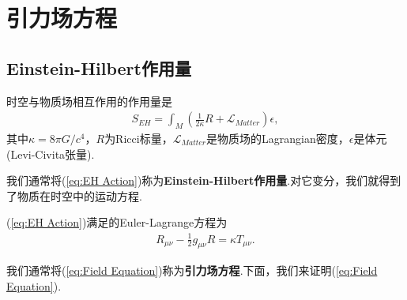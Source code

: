 \section{引力场方程}\label{sec:field equation}

\subsection{Einstein-Hilbert作用量}
\begin{definition}
    时空与物质场相互作用的作用量是
    \begin{eqnarray}\label{eq:EH Action}
        S_{EH}=\int_M\left(\frac{1}{2\kappa}R+\mathcal{L} _{Matter}\right)\epsilon,
    \end{eqnarray}
    其中$\kappa=8\pi G/c^4$，$R$为Ricci标量，$\mathcal{L} _{Matter}$是物质场的Lagrangian密度，$\epsilon$是体元(Levi-Civita张量).
\end{definition}
我们通常将(\ref{eq:EH Action})称为\textbf{Einstein-Hilbert作用量}.对它变分，我们就得到了物质在时空中的运动方程.
\begin{theorem}
    (\ref{eq:EH Action})满足的Euler-Lagrange方程为
    \begin{eqnarray}\label{eq:Field Equation}
        R_{\mu\nu}-\frac{1}{2}g_{\mu\nu}R=\kappa T_{\mu\nu}.
    \end{eqnarray}
\end{theorem}
我们通常将(\ref{eq:Field Equation})称为\textbf{引力场方程}.下面，我们来证明(\ref{eq:Field Equation}).
